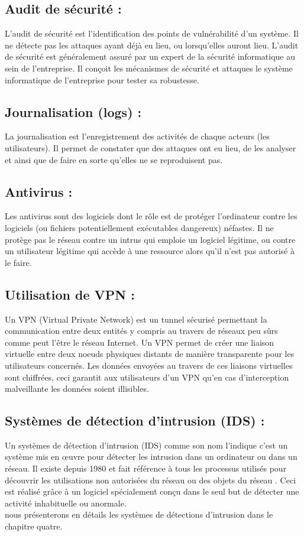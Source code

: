 \subsection{Audit de sécurité :}
L’audit de sécurité est l’identification des points de vulnérabilité d’un système. Il ne détecte pas les attaques ayant déjà eu lieu, ou lorsqu'elles auront lieu. L’audit de sécurité est généralement assuré par un expert de la sécurité informatique au sein de l’entreprise. Il conçoit les mécanismes de sécurité et attaques le système informatique de l’entreprise pour tester sa robustesse.
\subsection{Journalisation (logs) :}
La journalisation est l’enregistrement des activités de chaque acteurs (les utilisateurs). Il permet de constater que des attaques ont eu lieu, de les analyser et ainsi que de faire en sorte qu'elles ne se reproduisent pas.
\subsection{Antivirus :}
Les antivirus sont des logiciels dont le rôle est de protéger l’ordinateur contre les logiciels (ou fichiers potentiellement exécutables dangereux) néfastes. Il ne protège pas le réseau contre un intrus qui emploie un logiciel légitime, ou contre un utilisateur légitime qui accède à une ressource alors qu'il n'est pas autorisé à le faire.
\subsection{Utilisation de VPN :}
Un VPN (Virtual Private Network) est un tunnel sécurisé permettant la communication entre deux entités y compris au travers de réseaux peu sûrs comme peut l’être le réseau Internet. Un VPN permet de créer une liaison virtuelle entre deux noeuds physiques distants de manière transparente pour les utilisateurs concernés. Les données envoyées au travers de ces liaisons virtuelles sont chiffrées, ceci garantit aux utilisateurs d’un VPN qu’en cas d’interception malveillante les données soient illisibles.
\subsection{Systèmes de détection d'intrusion (IDS) :}
Un systèmes de détection d’intrusion (IDS) comme son nom l'indique c'est un système mis en œuvre pour détecter les intrusion dans un ordinateur ou dans un réseau.
Il existe depuis 1980 \cite{refids} et fait référence à tous les processus utilisés pour découvrir les utilisations non autorisées du réseau ou des objets du réseau . Ceci est réalisé grâce à un logiciel spécialement conçu dans le seul but de détecter une activité inhabituelle ou anormale.\\ nous présenterons en détails les systèmes de détections d'intrusion dans le chapitre quatre. 

